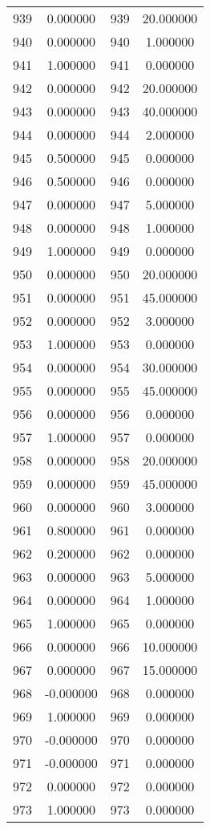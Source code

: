 \documentclass[12pt]{article}
\begin{document}
\begin{longtable}{@{}cccc@{}}
939 & 0.000000 & 939 & 20.000000 \\
940 & 0.000000 & 940 & 1.000000 \\
941 & 1.000000 & 941 & 0.000000 \\
942 & 0.000000 & 942 & 20.000000 \\
943 & 0.000000 & 943 & 40.000000 \\
944 & 0.000000 & 944 & 2.000000 \\
945 & 0.500000 & 945 & 0.000000 \\
946 & 0.500000 & 946 & 0.000000 \\
947 & 0.000000 & 947 & 5.000000 \\
948 & 0.000000 & 948 & 1.000000 \\
949 & 1.000000 & 949 & 0.000000 \\
950 & 0.000000 & 950 & 20.000000 \\
951 & 0.000000 & 951 & 45.000000 \\
952 & 0.000000 & 952 & 3.000000 \\
953 & 1.000000 & 953 & 0.000000 \\
954 & 0.000000 & 954 & 30.000000 \\
955 & 0.000000 & 955 & 45.000000 \\
956 & 0.000000 & 956 & 0.000000 \\
957 & 1.000000 & 957 & 0.000000 \\
958 & 0.000000 & 958 & 20.000000 \\
959 & 0.000000 & 959 & 45.000000 \\
960 & 0.000000 & 960 & 3.000000 \\
961 & 0.800000 & 961 & 0.000000 \\
962 & 0.200000 & 962 & 0.000000 \\
963 & 0.000000 & 963 & 5.000000 \\
964 & 0.000000 & 964 & 1.000000 \\
965 & 1.000000 & 965 & 0.000000 \\
966 & 0.000000 & 966 & 10.000000 \\
967 & 0.000000 & 967 & 15.000000 \\
968 & -0.000000 & 968 & 0.000000 \\
969 & 1.000000 & 969 & 0.000000 \\
970 & -0.000000 & 970 & 0.000000 \\
971 & -0.000000 & 971 & 0.000000 \\
972 & 0.000000 & 972 & 0.000000 \\
973 & 1.000000 & 973 & 0.000000 \\

\end{longtable}
\end{document}
